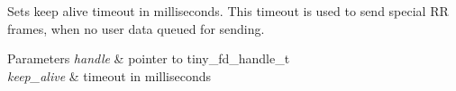 Sets keep alive timeout in milliseconds. This timeout is used to send special RR frames, when no user data queued for sending. 
\begin{DoxyParams}{Parameters}
{\em handle} & pointer to tiny\+\_\+fd\+\_\+handle\+\_\+t \\
\hline
{\em keep\+\_\+alive} & timeout in milliseconds \\
\hline
\end{DoxyParams}
